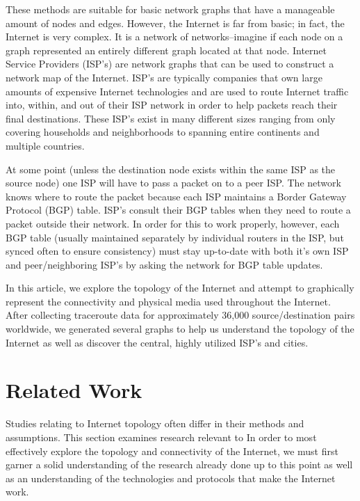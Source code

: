 \documentclass{sigcomm-alternate}
\begin{document}
	These methods are suitable for basic network graphs that have a manageable amount of nodes and edges. However, the Internet is far from basic; in fact, the Internet is very complex. It is a network of networks–imagine if each node on a graph represented an entirely different graph located at that node. Internet Service Providers (ISP's) are network graphs that can be used to construct a network map of the Internet. ISP's are typically companies that own large amounts of expensive Internet technologies and are used to route Internet traffic into, within, and out of their ISP network in order to help packets reach their final destinations. These ISP's exist in many different sizes ranging from only covering households and neighborhoods to spanning entire continents and multiple countries. 
	
	At some point (unless the destination node exists within the same ISP as the source node) one ISP will have to pass a packet on to a peer ISP. The network knows where to route the packet because each ISP maintains a Border Gateway Protocol (BGP) table. ISP's consult their BGP tables when they need to route a packet outside their network. In order for this to work properly, however, each BGP table (usually maintained separately by individual routers in the ISP, but synced often to ensure consistency) must stay up-to-date with both it's own ISP and peer/neighboring ISP's by asking the network for BGP table updates. 
	
	In this article, we explore the topology of the Internet and attempt to graphically represent the connectivity and physical media used throughout the Internet. After collecting traceroute data for approximately 36,000 source/destination pairs worldwide, we generated several graphs to help us understand the topology of the Internet as well as discover the central, highly utilized ISP's and cities.

\section{Related Work}
Studies relating to Internet topology often differ in their methods and assumptions. This section examines research relevant to 
In order to most effectively explore the topology and connectivity of the Internet, we must first garner a solid understanding of the research already done up to this point as well as an understanding of the technologies and protocols that make the Internet work.
\end{document}
